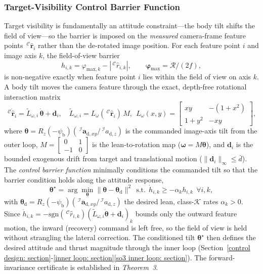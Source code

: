 \documentclass{IEEEtaes}
\begin{document}
\subsubsection{Target-Visibility Control Barrier Function} \label{acceleration conditioning: section}
Target visibility is fundamentally an attitude constraint---the body tilt shifts the field of view---so the barrier is imposed on the \emph{measured} camera-frame feature points $\,^\mathcal{C}\hat{\boldsymbol{r}}_i$ rather than the de-rotated image position. For each feature point $i$ and image axis $k$, the field-of-view barrier
\begin{equation} \label{cbf barrier: equation}
    h_{i,k} = \varphi_{\text{max},k} - |\,^\mathcal{C}\hat{r}_{i,k}|,\qquad \boldsymbol{\varphi}_\text{max}=\mathcal{R}/(2f),
\end{equation}
is non-negative exactly when feature point $i$ lies within the field of view on axis $k$. A body tilt moves the camera feature through the exact, depth-free rotational interaction matrix
\begin{equation} \label{Lw: equation}
    \,^\mathcal{C}\dot{\hat{\boldsymbol{r}}}_i = \tilde{L}_{\omega,i}\,\dot{\boldsymbol{\theta}} + \boldsymbol{d}_i,\quad \tilde{L}_{\omega,i}=L_\omega(\,^\mathcal{C}\hat{\boldsymbol{r}}_i)\,M,\ \ L_\omega(x,y)=\begin{bmatrix} xy & -(1+x^2)\\ 1+y^2 & -xy\end{bmatrix},
\end{equation}
where $\boldsymbol{\theta}=R_z(-\psi_\text{b})(\,^\mathcal{I}\boldsymbol{a}_{\text{d},xy}/\,^\mathcal{I}a_{\text{d},z})$ is the commanded image-axis tilt from the outer loop, $M=[\begin{smallmatrix}0&1\\-1&0\end{smallmatrix}]$ is the lean-to-rotation map ($\boldsymbol{\omega}=M\boldsymbol{\theta}$), and $\boldsymbol{d}_i$ is the bounded exogenous drift from target and translational motion ($\|\boldsymbol{d}_i\|_\infty\le\bar{d}$). The \emph{control barrier function} minimally conditions the commanded tilt so that the barrier condition holds along the attitude response,
\begin{equation} \label{cbf qp: equation}
    \boldsymbol{\theta}^\star=\arg\min_{\boldsymbol{\theta}}\|\boldsymbol{\theta}-\boldsymbol{\theta}_\text{d}\|^2\ \ \text{s.t.}\ \ \dot{h}_{i,k}\ge-\alpha_k h_{i,k}\ \ \forall i,k,
\end{equation}
with $\boldsymbol{\theta}_\text{d}=R_z(-\psi_\text{b})(\,^\mathcal{I}\boldsymbol{a}_{\text{d},xy}/\,^\mathcal{I}a_{\text{d},z})$ the desired lean, class-$\mathcal{K}$ rates $\alpha_k>0$. Since $\dot{h}_{i,k}=-\mathrm{sgn}(\,^\mathcal{C}\hat{r}_{i,k})(\tilde{L}_{\omega,i}\dot{\boldsymbol{\theta}}+\boldsymbol{d}_i)_k$ bounds only the outward feature motion, the inward (recovery) command is left free, so the field of view is held without strangling the lateral correction. The conditioned tilt $\boldsymbol{\theta}^\star$ then defines the desired attitude and thrust magnitude through the inner loop (Section~\ref{control design: section}-\ref{inner loop: section}\ref{so3 inner loop: section}). The forward-invariance certificate is established in \textit{Theorem~3}.
\end{document}
